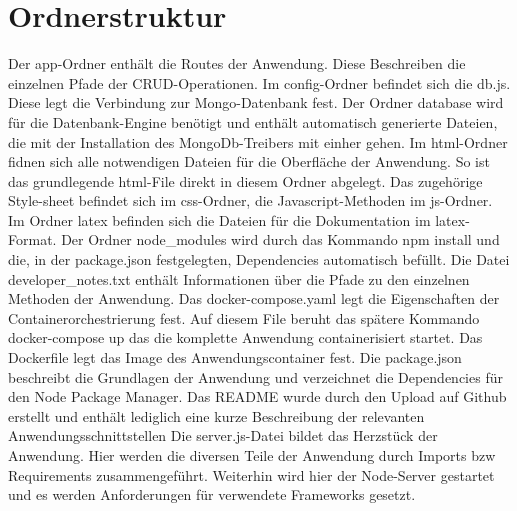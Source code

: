 
\chapter{Ordnerstruktur}
\label{ch:Ordnerstruktur}
Der app-Ordner enthält die Routes der Anwendung. Diese Beschreiben die einzelnen Pfade der CRUD-Operationen.
Im config-Ordner befindet sich die db.js. Diese legt die Verbindung zur Mongo-Datenbank fest.
Der Ordner database wird für die Datenbank-Engine benötigt und enthält automatisch generierte Dateien, die mit der Installation des MongoDb-Treibers mit einher gehen.
Im html-Ordner fidnen sich alle notwendigen Dateien für die Oberfläche der Anwendung. So ist das grundlegende html-File direkt in diesem Ordner abgelegt. Das zugehörige Style-sheet befindet sich im css-Ordner, die Javascript-Methoden im js-Ordner.
Im Ordner latex befinden sich die Dateien für die Dokumentation im latex-Format.
Der Ordner node\_modules wird durch das Kommando \glqq  npm install\grqq{} und die, in der package.json festgelegten, Dependencies automatisch befüllt.
Die Datei \glqq  developer\_notes.txt \grqq{} enthält Informationen über die Pfade zu den einzelnen Methoden der Anwendung.
Das docker-compose.yaml legt die Eigenschaften der Containerorchestrierung fest. Auf diesem File beruht das spätere Kommando \glqq  docker-compose up\grqq{} das die komplette Anwendung containerisiert startet.
Das Dockerfile legt das Image des Anwendungscontainer fest.
Die package.json beschreibt die Grundlagen der Anwendung und verzeichnet die Dependencies für den Node Package Manager.
Das README wurde durch den Upload auf Github erstellt und enthält lediglich eine kurze Beschreibung der relevanten Anwendungsschnittstellen
Die server.js-Datei bildet das Herzstück der Anwendung. Hier werden die diversen Teile der Anwendung durch Imports bzw Requirements zusammengeführt. Weiterhin wird hier der Node-Server gestartet und es werden Anforderungen für verwendete Frameworks gesetzt.